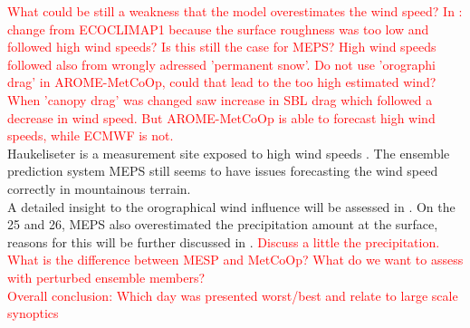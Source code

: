 \textcolor{red}{What could be still a weakness that the model overestimates the wind speed? In \citet{muller_arome-metcoop:_2017}: change from ECOCLIMAP1 because the surface roughness was too low and followed high wind speeds? Is this still the case for MEPS? High wind speeds followed also from wrongly adressed 'permanent snow'. Do not use 'orographi drag' in AROME-MetCoOp, could that lead to the too high estimated wind? When 'canopy drag' was changed saw increase in SBL drag which followed a decrease in wind speed. But AROME-MetCoOp is able to forecast high wind speeds, while ECMWF is not.}
\\
Haukeliseter is a measurement site exposed to high wind speeds \citep{wolff_measurements_2013,wolff_derivation_2015}. The ensemble prediction system MEPS still seems to have issues forecasting the wind speed correctly in mountainous terrain.
\\
A detailed insight to the orographical wind influence will be assessed in . On the \num{25} and \SI{26}{\dec}, MEPS also overestimated the precipitation amount at the surface, reasons for this will be further discussed in .
\textcolor{red}{Discuss a little the precipitation. \\
	What is the difference between MESP and MetCoOp? What do we want to assess with perturbed ensemble members?\\
	Overall conclusion: Which day was presented worst/best and relate to large scale synoptics}

